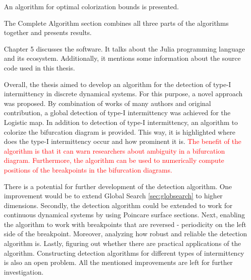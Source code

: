 An algorithm for optimal colorization bounds is presented.
\par
The Complete Algorithm section combines all three parts of the algorithms together and presents results.
\par
Chapter 5 discusses the software.
It talks about the Julia programming language and its ecosystem.
Additionally, it mentions some information about the source code used in this thesis.
\par
Overall, the thesis aimed to develop an algorithm for the detection of type-I intermittency in discrete dynamical systems.
For this purpose, a novel approach was proposed.
By combination of works of many authors and original contribution, a global detection of type-I intermittency was achieved for the Logistic map.
In addition to detection of type-I intermittency, an algorithm to colorize the bifurcation diagram is provided.
This way, it is highlighted where does the type-I intermittency occur and how prominent it is.
\textcolor{red}{The benefit of the algorithm is that it can warn researchers about ambiguity in a bifurcation diagram. 
Furthermore, the algorithm can be used to numerically compute positions of the breakpoints in the bifurcation diagrams.
}
\par
There is a potential for further development of the detection algorithm.
One improvement would be to extend Global Search \ref{sec:globsearch} to higher dimensions.
Secondly, the detection algorithm could be extended to work for continuous dynamical systems by using Poincare surface sections.
Next, enabling the algorithm to work with breakpoints that are reversed - periodicity on the left side of the breakpoint.
Moreover, analyzing how robust and reliable the detection algorithm is.
Lastly, figuring out whether there are practical applications of the algorithm.
Constructing detection algorithms for different types of intermittency is also an open problem.
All the mentioned improvements are left for further investigation.

\endinput